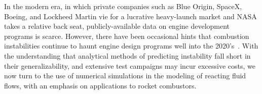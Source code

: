 In the modern era, in which private companies such as Blue Origin, SpaceX, Boeing, and Lockheed Martin vie for a lucrative heavy-launch market and NASA takes a relative back seat, publicly-available data on engine development programs is scarce. However, there have been occasional hints that combustion instabilities continue to haunt engine design programs well into the 2020's~\cite{blueOriginTweet}. With the understanding that analytical methods of predicting instability fall short in their generalizability, and extensive test campaigns may incur excessive costs, we now turn to the use of numerical simulations in the modeling of reacting fluid flows, with an emphasis on applications to rocket combustors.
